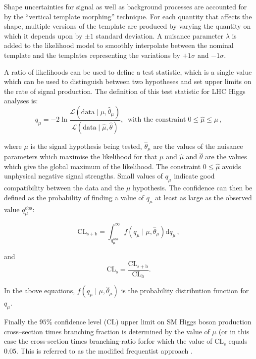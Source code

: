 Shape uncertainties for signal as well as background processes are accounted 
for by the ``vertical template morphing'' technique. For each quantity that affects the shape,
multiple versions of the template are produced by varying the quantity on which it 
depends upon by $\pm 1$ standard deviation. A nuisance parameter $\lambda$ is added to the likelihood model 
to smoothly interpolate between the nominal template
and the templates representing the variations by $+1 \sigma$ and $-1 \sigma$.

A ratio of likelihoods can be used to define a test statistic, which is a
single value which can be used to distinguish between two hypotheses and set
upper limits on the rate of signal production. The definition of this test
statistic for \ac{LHC} Higgs analyses is: 
\begin{equation}
q_{\mu} = -2
\ln\frac{\mathcal{L}(\mathrm{data}\mid\mu,\hat{\theta}_{\mu})}{\mathcal{L}(\mathrm{data}\mid\hat{\mu},\hat{\theta})},
\;\; \text{with the constraint} \; 0\leq\hat{\mu}\leq\mu\, ,
\end{equation}

where $\mu$ is the signal hypothesis being tested, $\hat{\theta}_{\mu}$ are the
values of the nuisance parameters which maximise the likelihood for that $\mu$
and $\hat{\mu}$ and $\hat{\theta}$ are the values which give the global maximum
of the likelihood. The constraint $0\leq\hat{\mu}$ avoids unphysical negative
signal strengths. Small values of $q_{\mu}$ indicate good compatibility between
the data and the $\mu$ hypothesis. The confidence can then be defined as the
probability of finding a value of $q_{\mu}$ at least as large as the observed
value $q_{\mu}^{\mathrm{obs}}$: 

\begin{equation} \label{eqn:cl_splusb}
\mathrm{CL_{s+b}} =
\int_{q_{\mu}^{\mathrm{obs}}}^{\infty}f(q_{\mu}\mid\mu,\hat{\theta}_{\mu})\mathrm{d}q_{\mu}\,
,
\end{equation}

and 
\begin{equation}
\mathrm{CL_{s}} = \frac{\mathrm{CL_{s+b}}}{\mathrm{CL_{b}}}.
\end{equation}

In the above equations, $f(q_{\mu}\mid\mu,\hat{\theta}_{\mu})$ is the
probability distribution function for $q_{\mu}$. 

Finally the $95\%$ confidence level (CL) upper limit on \ac{SM} Higgs boson production
cross--section times branching fraction is determined by the value of $\mu$ (or
in this case the cross-section times branching-ratio forfor which the value of 
$\mathrm{CL_{s}}$ equals $0.05$. This is referred to as the modified frequentist approach
\cite{Read2}.

